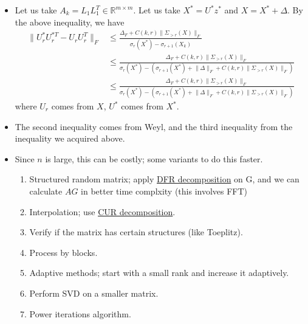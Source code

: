 \documentclass[11pt,reqno]{amsart}
\theoremstyle{remark}
\begin{document}
\begin{sloppypar}
\begin{itemize}
\item Let us take $A_k=L_1L_1^T\in\mathbb{R}^{m\times m}$.
Let us take $X^*=U^*z^*$ and $X=X^*+\Delta$.
By the above inequality, we have
\begin{align*}
\lVert U_r^*U_r^{*T}-U_rU_r^T\rVert_F & \leq\frac{\Delta_F+C(k,r)\lVert\Sigma_{>r}(X)\rVert_F}{\sigma_r(X^*)-\sigma_{r+1}(X_k)}\\
&\leq\frac{\Delta_F+C(k,r)\lVert\Sigma_{>r}(X)\rVert_F}{\sigma_r(X^*)-(\sigma_{r+1}(X^*)+\lVert \Delta\rVert_F+C(k,r)\lVert \Sigma_{>r}(X)\rVert_F)}\\
&\leq\frac{\Delta_F+C(k,r)\lVert\Sigma_{>r}(X)\rVert_F}{\sigma_r(X^*)-(\sigma_{r+1}(X^*)+\lVert \Delta\rVert_F+C(k,r)\lVert \Sigma_{>r}(X)\rVert_F)}
\end{align*}
where $U_r$ comes from $X$, $U^*$ comes from $X^*$.
\item The second inequality comes from Weyl, and the third inequality from the inequality we acquired above.
\item Since $n$ is large, this can be costly; some variants to do this faster.
\begin{enumerate}
\item Structured random matrix; apply \href{https://www.mathc.rwth-aachen.de/~rauhut/files/LinzRauhut.pdf}{DFR decomposition} on G, and we can calculate $AG$
 in better time complxity (this involves FFT)
\item Interpolation; use \href{https://docs.oracle.com/en/database/oracle/machine-learning/oml4sql/21/dmcon/cur-matrix-decomposition.html#GUID-9C3BF153-3A2B-4B4B-B711-D48976806799}
{CUR decomposition}.
\item Verify if the matrix has certain structures (like Toeplitz).
\item Process by blocks.
\item Adaptive methods; start with a small rank and increase it adaptively.
\item Perform SVD on a smaller matrix.
\item Power iterations algorithm.
\end{enumerate}
\end{itemize}


\end{sloppypar}
\end{document}
